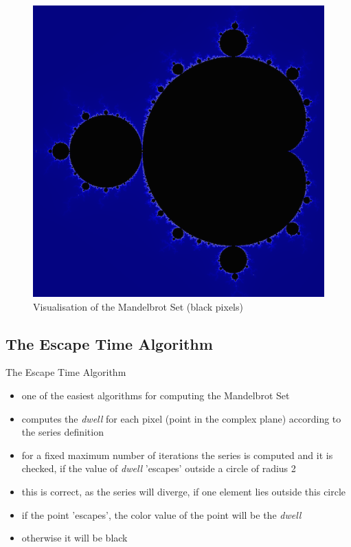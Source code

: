 \documentclass[fleqn,11pt,aspectratio=43]{beamer}
\begin{document}
\begin{frame}
	\begin{figure}
		\includegraphics[height=0.9\textheight]{colored-mandelbrot-set.png}
		\caption{Visualisation of the Mandelbrot Set (black pixels)}
	\end{figure}
\end{frame}

\subsection{The Escape Time Algorithm}

\begin{frame}{The Escape Time Algorithm}
	\begin{itemize}
		\item one of the easiest algorithms for computing the Mandelbrot Set
		\item computes the \textit{dwell} for each pixel (point in the complex plane) according to the series definition
		\item for a fixed maximum number of iterations the series is computed and it is checked, if the value of \textit{dwell} 'escapes' outside a circle of radius 2
		\item this is correct, as the series will diverge, if one element lies outside this circle
		\item if the point 'escapes', the color value of the point will be the \textit{dwell}
		\item otherwise it will be black
	\end{itemize}
\end{frame}
\end{document}

